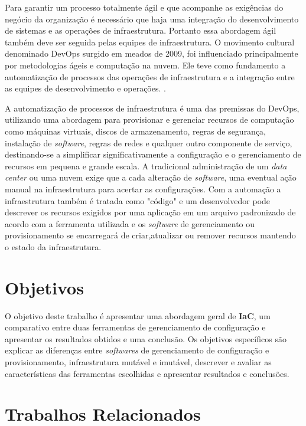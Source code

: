 Para garantir um processo totalmente ágil e que acompanhe as exigências do negócio da organização é necessário que haja uma integração do desenvolvimento de sistemas e as operações de infraestrutura. Portanto essa abordagem ágil também deve ser seguida pelas equipes de infraestrutura.
O movimento cultural denominado DevOps surgido em meados de 2009, foi influenciado principalmente por metodologias ágeis e computação na nuvem. Ele teve como fundamento a automatização de processos das operações de infraestrutura e a integração entre as equipes de desenvolvimento e operações. \cite{sato}.

A automatização de processos de infraestrutura é uma das premissas do DevOps, utilizando uma abordagem para provisionar e gerenciar recursos de computação como máquinas virtuais, discos de armazenamento, regras de segurança, instalação de \textit{software}, regras de redes e qualquer outro componente de serviço, destinando-se a simplificar significativamente a configuração e o gerenciamento de recursos em pequena e grande escala. A tradicional administração de um \textit{data center} ou uma nuvem exige que a cada alteração de \textit{software}, uma eventual ação manual na infraestrutura para acertar as configurações. Com a automação a infraestrutura também é tratada como "código" e um desenvolvedor pode descrever os recursos exigidos por uma aplicação em um arquivo padronizado de acordo com a ferramenta utilizada e os \textit{software} de gerenciamento ou provisionamento se encarregará de criar,atualizar ou remover recursos mantendo o estado da infraestrutura. 

\section{\esp Objetivos}

O objetivo deste trabalho é apresentar uma abordagem geral de \textbf{IaC}, um comparativo entre duas ferramentas de gerenciamento de configuração e apresentar os resultados obtidos e uma conclusão. 
Os objetivos específicos são explicar as diferenças entre \textit{softwares} de gerenciamento de configuração e provisionamento, infraestrutura mutável e imutável, descrever e avaliar as características das ferramentas escolhidas e apresentar resultados e conclusões. 

\section{\esp Trabalhos Relacionados}


